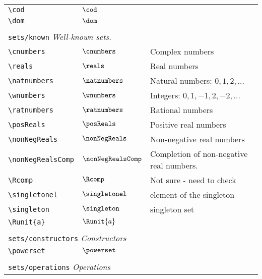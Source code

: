 \begin{longtable}{lll}
 {\color[rgb]{0.5,0.5,0.5}\texttt{\textbackslash cod}} & $\cod$ & \\ 
 {\color[rgb]{0.5,0.5,0.5}\texttt{\textbackslash dom}} & $\dom$ & \\ 
  &  & \\ 
 \multicolumn{3}{l}{{\color[rgb]{0.5,0.5,0.5}\texttt{sets/known}} \emph{Well-known sets.}}\\ 
 \hline
{\color[rgb]{0.5,0.5,0.5}\texttt{\textbackslash cnumbers}} & $\cnumbers$ &  Complex numbers\\ 
 {\color[rgb]{0.5,0.5,0.5}\texttt{\textbackslash reals}} & $\reals$ &  Real numbers\\ 
 {\color[rgb]{0.5,0.5,0.5}\texttt{\textbackslash natnumbers}} & $\natnumbers$ &  Natural numbers: $0, 1, 2, \dots$\\ 
 {\color[rgb]{0.5,0.5,0.5}\texttt{\textbackslash wnumbers}} & $\wnumbers$ &  Integers: $0, 1, -1, 2, -2, \dots$\\ 
 {\color[rgb]{0.5,0.5,0.5}\texttt{\textbackslash ratnumbers}} & $\ratnumbers$ &  Rational numbers\\ 
 {\color[rgb]{0.5,0.5,0.5}\texttt{\textbackslash posReals}} & $\posReals$ &  Positive real numbers\\ 
 {\color[rgb]{0.5,0.5,0.5}\texttt{\textbackslash nonNegReals}} & $\nonNegReals$ &  Non-negative real numbers\\ 
 {\color[rgb]{0.5,0.5,0.5}\texttt{\textbackslash nonNegRealsComp}} & $\nonNegRealsComp$ &  Completion of non-negative real numbers.\\ 
 {\color[rgb]{0.5,0.5,0.5}\texttt{\textbackslash Rcomp}} & $\Rcomp$ &  Not sure - need to check\\ 
 {\color[rgb]{0.5,0.5,0.5}\texttt{\textbackslash singletonel}} & $\singletonel$ &  element of the singleton\\ 
 {\color[rgb]{0.5,0.5,0.5}\texttt{\textbackslash singleton}} & $\singleton$ &  singleton set\\ 
 {\color[rgb]{0.5,0.5,0.5}\texttt{\textbackslash Runit\{a\}}} & $\Runit{a}$ & \\ 
  &  & \\ 
 \multicolumn{3}{l}{{\color[rgb]{0.5,0.5,0.5}\texttt{sets/constructors}} \emph{Constructors}}\\ 
 \hline
{\color[rgb]{0.5,0.5,0.5}\texttt{\textbackslash powerset}} & $\powerset$ & \\ 
  &  & \\ 
 \multicolumn{3}{l}{{\color[rgb]{0.5,0.5,0.5}\texttt{sets/operations}} \emph{Operations}}\\ 

\end{longtable}
